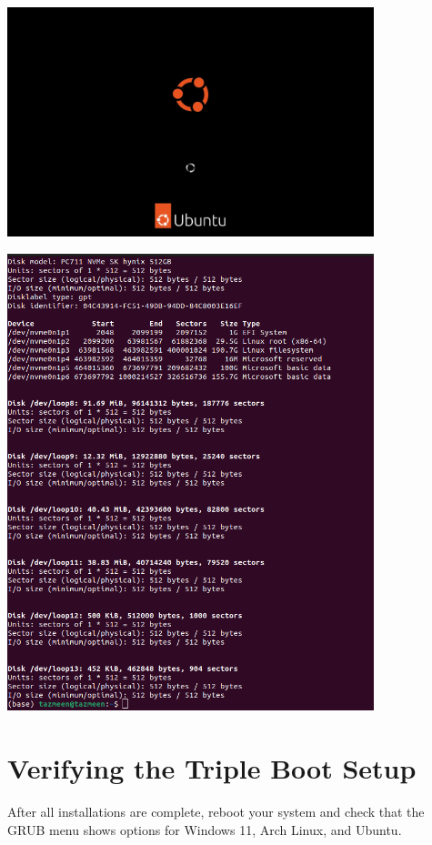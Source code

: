\documentclass[a4paper]{article}
\begin{document}
\begin{center}
    \includegraphics[width=0.8\textwidth]{40.jpeg} %
\end{center}
\begin{center}
    \includegraphics[width=0.8\textwidth]{41.png} %
\end{center}

\section{Verifying the Triple Boot Setup}
After all installations are complete, reboot your system and check that the GRUB menu shows options for Windows 11, Arch Linux, and Ubuntu.
\end{document}
